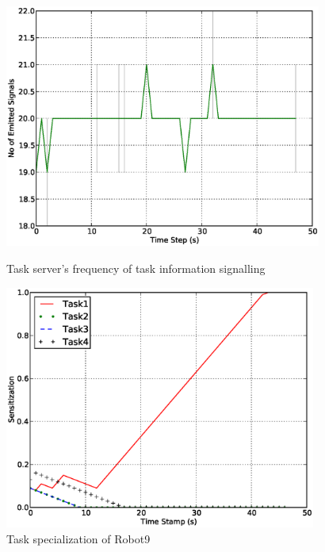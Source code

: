 \documentclass{llncs}
\begin{document}
\begin{figure}
\centering
\includegraphics[height=8cm, angle=0]
{images/global/Global-SignalingFreqStat.eps}
\caption{\small Task server's frequency of task information signalling}
\label{fig:signal-frequency-stat} %
\centering
\includegraphics[height=8cm, angle=0]{images/global/PlotRobot9-Sensitizations-2010Feb18-121037.eps}
\caption{\small Task specialization of Robot9}
\label{fig:single-robot-sensitizations} %
\end{figure}
\end{document}
